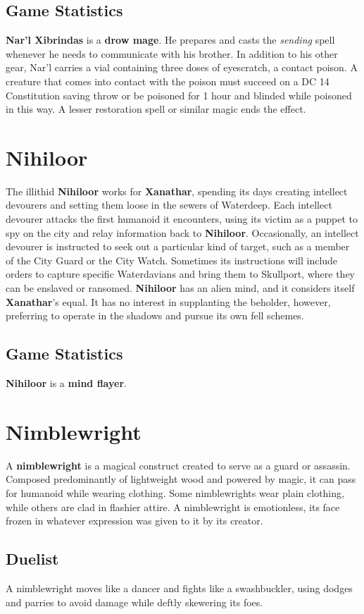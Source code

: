 \documentclass[10pt,a4paper,twoside,twocolumn,openany,nodeprecatedcode]{dndbook}
\begin{document}
\subsection{Game Statistics}
\textbf{Nar'l Xibrindas} is a \textbf{drow mage}. He prepares and casts the \textit{sending} spell whenever he needs to communicate with his brother.
In addition to his other gear, Nar'l carries a vial containing three doses of eyescratch, a contact poison. A creature that comes into contact with the poison must succeed on a DC 14 Constitution saving throw or be poisoned for 1 hour and blinded while poisoned in this way. A lesser restoration spell or similar magic ends the effect.
\section{Nihiloor}
The illithid \textbf{Nihiloor} works for \textbf{Xanathar}, spending its days creating intellect devourers and setting them loose in the sewers of Waterdeep. Each intellect devourer attacks the first humanoid it encounters, using its victim as a puppet to spy on the city and relay information back to \textbf{Nihiloor}. Occasionally, an intellect devourer is instructed to seek out a particular kind of target, such as a member of the City Guard or the City Watch. Sometimes its instructions will include orders to capture specific Waterdavians and bring them to Skullport, where they can be enslaved or ransomed.
\textbf{Nihiloor} has an alien mind, and it considers itself \textbf{Xanathar}'s equal. It has no interest in supplanting the beholder, however, preferring to operate in the shadows and pursue its own fell schemes.
\subsection{Game Statistics}
\textbf{Nihiloor} is a \textbf{mind flayer}.
\section{Nimblewright}
A \textbf{nimblewright} is a magical construct created to serve as a guard or assassin. Composed predominantly of lightweight wood and powered by magic, it can pass for humanoid while wearing clothing. Some nimblewrights wear plain clothing, while others are clad in flashier attire. A nimblewright is emotionless, its face frozen in whatever expression was given to it by its creator.
\subsection{Duelist}
A nimblewright moves like a dancer and fights like a swashbuckler, using dodges and parries to avoid damage while deftly skewering its foes.
\end{document}
